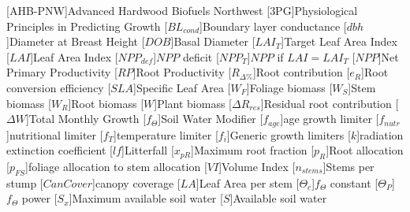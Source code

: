 \usepackage[printonlyused]{acronym}
[AHB-PNW]{Advanced Hardwood Biofuels Northwest}
[\textsc{3PG}]{Physiological Principles in Predicting Growth}
[\ensuremath{BL_{cond}}]{Boundary layer conductance}
[\ensuremath{dbh}]{Diameter at Breast Height}
[\ensuremath{DOB}]{Basal Diameter}
[\ensuremath{LAI_{T}}]{Target Leaf Area Index}
[\ensuremath{LAI}]{Leaf Area Index}
[\ensuremath{NPP_{def}}]{$NPP$ deficit}
[\ensuremath{NPP_{T}}]{$NPP$ if $LAI = LAI_{T}$}
[\ensuremath{NPP}]{Net Primary Productivity}
[\ensuremath{RP}]{Root Productivity}
[\ensuremath{R_{\Delta\%}}]{Root contribution}
[\ensuremath{e_{R}}]{Root conversion efficiency}
[\ensuremath{SLA}]{Specific Leaf Area}
[\ensuremath{W_F}]{Foliage biomass}
[\ensuremath{W_S}]{Stem biomass}
[\ensuremath{W_R}]{Root biomass}
[\ensuremath{W}]{Plant biomass}
[\ensuremath{\Delta R_{res}}]{Residual root contribution}
[\ensuremath{\Delta W}]{Total Monthly Growth}
[\ensuremath{f_\Theta}]{Soil Water Modifier}
[\ensuremath{f_{age}}]{age growth limiter}
[\ensuremath{f_{nutr}}]{nutritional limiter}
[\ensuremath{f_T}]{temperature limiter}
[\ensuremath{f_i}]{Generic growth limiters}
[\ensuremath{k}]{radiation extinction coefficient}
[\ensuremath{lf}]{Litterfall}
[\ensuremath{x_{pR}}]{Maximum root fraction}
[\ensuremath{p_R}]{Root allocation}
[\ensuremath{p_{FS}}]{foliage allocation to stem allocation}
[\ensuremath{VI}]{Volume Index}
[\ensuremath{n_{stems}}]{Stems per stump}
[\ensuremath{CanCover}]{canopy coverage}
[\ensuremath{LA}]{Leaf Area per stem}
[\ensuremath{\Theta_{c}}]{$f_\Theta$ constant}
[\ensuremath{\Theta_{P}}]{$f_\Theta$ power}
[\ensuremath{S_x}]{Maximum available soil water}
[\ensuremath{S}]{Available soil water}

